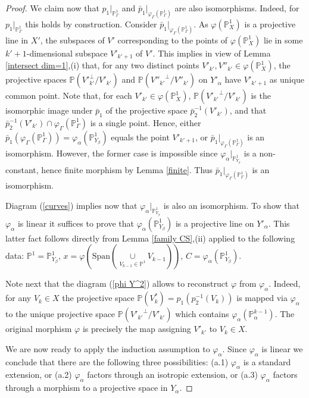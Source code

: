 \documentclass[12pt]{amsart}
\newcommand\Span{\text{Span}}
\renewcommand{\phi}{\varphi}
\theoremstyle{definition}
\begin{document}
\begin{proof}
We claim now that $p_1|_{\mathbb{P}^1_{\Gamma}}$ and $\bar{p}_1|_{\phi_{\Gamma}(\mathbb{P}^1_{\Gamma})}$ are also
isomorphisms. Indeed, for $p_1|_{\mathbb{P}^1_{\Gamma}}$ this holds by construction. Consider
$\bar{p}_1|_{\phi_{\Gamma}(\mathbb{P}^1_{\Gamma})}$. As $\phi(\mathbb{P}^1_X)$ is a projective line in $X'$, the
subspaces of $V'$ corresponding to the points of $\phi(\mathbb{P}^1_X)$ lie in some $k'+1$-dimensional subspace
$V'_{k'+1}$ of $V'$. This implies in view of Lemma \ref{intersect dim=1},(i) that, for any two distinct points
$V'_{k'},V''_{k'}\in\phi(\mathbb{P}^1_X)$, the projective spaces $\mathbb{P}({V'}_{k'}^\bot/V'_{k'})$ and
$\mathbb{P}({V''_{k'}}^\bot/V''_{k'})$ on $Y'_{\alpha}$ have $V'_{k'+1}$ as unique common point.
Note that, for each $V'_{k'}\in\phi(\mathbb{P}^1_X)$, $\mathbb{P}({V'_{k'}}^\bot/V'_{k'})$
is the isomorphic image under $\bar{p}_1$ of the projective space $\bar{p}_2^{-1}(V'_{k'})$, and that
$\bar{p}_2^{-1}(V'_{k'})\cap\phi_{\Gamma}(\mathbb{P}^1_{\Gamma})$ is a single point.
Hence, either $\bar{p}_1(\phi_{\Gamma}(\mathbb{P}^1_{\Gamma}))=\phi_{\alpha}(\mathbb{P}^1_{Y_{\beta}})$ equals the point
$V'_{k'+1}$, or $\bar{p}_1|_{\phi_{\Gamma}(\mathbb{P}^1_{\Gamma})}$ is an isomorphism. However, the former case is
impossible since $\phi_{\alpha}|_{\mathbb{P}^1_{Y_{\beta}}}$ is a non-constant, hence finite morphism by Lemma
\ref{finite}. Thus $\bar{p}_1|_{\phi_{\Gamma}(\mathbb{P}^1_{\Gamma})}$ is an isomorphism.

Diagram (\ref{curves}) implies now that $\phi_{\alpha}|_{\mathbb{P}^1_{Y_{\beta}}}$ is also an isomorphism.
To show that $\phi_{\alpha}$ is linear it suffices to prove that $\phi_{\alpha}(\mathbb{P}^1_{Y_{\beta}})$
is a projective line on $Y'_{\alpha}$. This latter fact follows directly from Lemma \ref{family CS},(ii)
applied to the following data: $\mathbb{P}^1=\mathbb{P}^1_{Y_{\beta}}$,
$x=\phi(\Span(\underset{V_{k-1}\in\mathbb{P}^1}\cup V_{k-1}))$, $C=\phi_{\alpha}(\mathbb{P}^1_{Y_{\beta}})$.



Note next that the diagram (\ref{phi Y^2}) allows to reconstruct $\phi$ from $\phi_{\alpha}$. Indeed, for any
$V_k\in X$ the projective space $\mathbb{P}(V_k^*)=p_1(p_2^{-1}(V_k))$ is mapped via
$\phi_{\alpha}$ to the unique projective space $\mathbb{P}({V'_{k'}}^\bot/V'_{k'})$ which contains
$\phi_{\alpha}(\mathbb{P}^{k-1}_{\alpha})$. The original morphism $\phi$ is precisely the map assigning $V'_{k'}$ to
$V_k\in X$.

We are now ready to apply the induction assumption to $\phi_{\alpha}$. Since $\phi_{\alpha}$ is linear we conclude that
there are the following three possibilities: (a.1) $\phi_{\alpha}$ is a standard extension, or (a.2) $\phi_{\alpha}$
factors through an isotropic extension, or (a.3) $\phi_{\alpha}$ factors through a morphism to a projective space in
$Y_\alpha$.


\end{proof}
\end{document}
